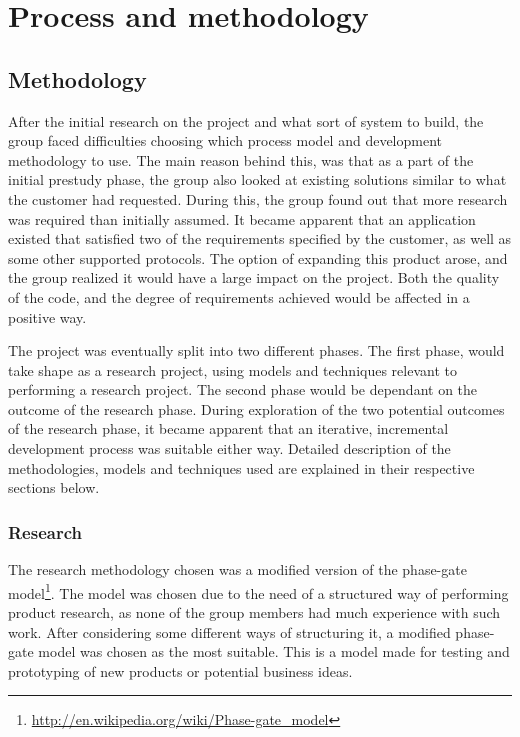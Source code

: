 
\chapter{Process and methodology}
\label{ch:process_and_methodology}

\section{Methodology}
\label{sec:process_and_methodology-process-methodology}

After the initial research on the project and what sort of system to build, the group faced difficulties choosing which process model and development methodology to use. The main reason behind this, was that as a part of the initial prestudy phase, the group also looked at existing solutions similar to what the customer had requested. During this, the group found out that more research was required than initially assumed. It became apparent that an application existed that satisfied two of the requirements specified by the customer, as well as some other supported protocols. The option of expanding this product arose, and the group realized it would have a large impact on the project. Both the quality of the code, and the degree of requirements achieved would be affected in a positive way.

The project was eventually split into two different phases. The first phase, would take shape as a research project, using models and techniques relevant to performing a research project. The second phase would be dependant on the outcome of the research phase. During exploration of the two potential outcomes of the research phase, it became apparent that an iterative, incremental development process was suitable either way. Detailed description of the methodologies, models and techniques used are explained in their respective sections below.

\subsection{Research}
\label{subsec:process_and_methodology-process-methodology-research}

The research methodology chosen was a modified version of the phase-gate model\footnote{\url{http://en.wikipedia.org/wiki/Phase-gate_model}}. The model was chosen due to the need of a structured way of performing product research, as none of the group members had much experience with such work. After considering some different ways of structuring it, a modified phase-gate model was chosen as the most suitable. This is a model made for testing and prototyping of new products or potential business ideas. 


